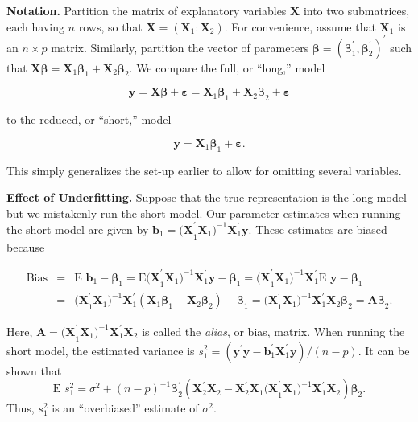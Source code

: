 \textbf{Notation.} Partition the matrix of explanatory variables
$\mathbf{X}$ into two submatrices, each having $n$ rows, so that
$\mathbf{X}=(\mathbf{X} _{1} : \mathbf{X}_{2})$. For convenience,
assume that $\mathbf{X}_{1}$ is an $ n\times p$ matrix. Similarly,
partition the vector of parameters $\boldsymbol \beta =\left(
\boldsymbol \beta _{1}^{\prime }, \boldsymbol \beta _{2}^{\prime
}\right) ^{\prime }$ such that $\mathbf{X \boldsymbol \beta
}=\mathbf{X}_{1} \boldsymbol \beta_{1}+ \mathbf{X}_{2} \boldsymbol
\beta_{2}$. We compare the full, or ``long,'' model
\begin{center}
\[
\mathbf{y}=\mathbf{X \boldsymbol \beta }+\boldsymbol \varepsilon = \mathbf{X}_{1} \boldsymbol \beta_{1}+%
\mathbf{X}_{2} \boldsymbol \beta_{2}+\boldsymbol \varepsilon
\]
\end{center}
to the reduced, or ``short,'' model
\begin{center}
\[
\mathbf{y}=\mathbf{X}_{1} \boldsymbol \beta_{1}+\boldsymbol
\varepsilon.
\]
\end{center}
This simply generalizes the set-up earlier to allow for omitting
several variables.

\textbf{Effect of Underfitting.} Suppose that the true
representation is the long model but we mistakenly run the short
model. Our parameter estimates
when running the short model are given by $\mathbf{b}_{1}=\mathbf{(X}%
_{1}^{\prime }\mathbf{X}_{1}\mathbf{)}^{-1}\mathbf{X}_{1}^{\prime
}\mathbf{y} $. These estimates are biased because
\begin{center}
\begin{eqnarray*}
\text{Bias} &=&\text{E }\mathbf{b}_{1}-\boldsymbol \beta_{1}
=\text{E}\mathbf{(X%
}_{1}^{\prime }\mathbf{X}_{1}\mathbf{)}^{-1}\mathbf{X}_{1}^{\prime }\mathbf{y%
}-\boldsymbol \beta_{1}
=\mathbf{(X}_{1}^{\prime }\mathbf{X}_{1}\mathbf{)}^{-1}%
\mathbf{X}_{1}^{\prime }\text{E }\mathbf{y}-\boldsymbol \beta_{1} \\
&=&\mathbf{(X}_{1}^{\prime }\mathbf{X}_{1}\mathbf{)}^{-1}\mathbf{X}%
_{1}^{\prime }\left( \mathbf{X}_{1}\boldsymbol
\beta_{1}+\mathbf{X}_{2}\boldsymbol \beta_{2}\right)
- \boldsymbol \beta_{1}=\mathbf{(X}_{1}^{\prime }\mathbf{X}%
_{1}\mathbf{)}^{-1}\mathbf{X}_{1}^{\prime }\mathbf{X}_{2}\boldsymbol \beta_{2}=%
\mathbf{A \boldsymbol \beta }_{2}.
\end{eqnarray*}
\end{center}
Here, $\mathbf{A}=\mathbf{(X}_{1}^{\prime }\mathbf{X}_{1}\mathbf{)}^{-1}%
\mathbf{X}_{1}^{\prime }\mathbf{X}_{2}$ is called the
\textit{alias}, or
bias, matrix. When running the short model, the estimated variance is $%
s_{1}^{2}=(\mathbf{y}^{\prime }\mathbf{y}-\mathbf{b}_{1}^{\prime }\mathbf{X}%
_{1}^{\prime }\mathbf{y})/(n-p)$. It can be shown that
\begin{equation}\label{E5:AliasBias}
\text{E }s_{1}^{2}=\sigma ^{2}+(n-p)^{-1}\boldsymbol
\beta_{2}^{\prime }\left(
\mathbf{X}_{2}^{\prime }\mathbf{X}_{2}-\mathbf{X}_{2}^{\prime }\mathbf{X}_{1}%
\mathbf{(X}_{1}^{\prime
}\mathbf{X}_{1}\mathbf{)}^{-1}\mathbf{X}_{1}^{\prime
}\mathbf{X}_{2}\right) \boldsymbol \beta_{2}.
\end{equation}
Thus, $s_{1}^{2}$ is an ``overbiased'' estimate of $\sigma ^{2}$.


